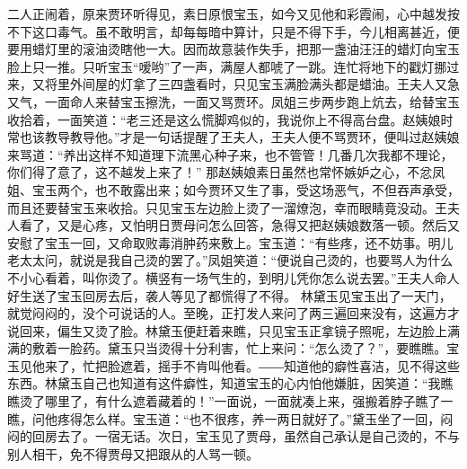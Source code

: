 \documentclass[12pt,oneside]{book}
\begin{document}
二人正闹着，原来贾环听得见，素日原恨宝玉，如今又见他和彩霞闹，心中越发按不下这口毒气。虽不敢明言，却每每暗中算计，只是不得下手，今儿相离甚近，便要用蜡灯里的滚油烫瞎他一大。因而故意装作失手，把那一盏油汪汪的蜡灯向宝玉脸上只一推。只听宝玉“嗳哟”了一声，满屋人都唬了一跳。连忙将地下的戳灯挪过来，又将里外间屋的灯拿了三四盏看时，只见宝玉满脸满头都是蜡油。王夫人又急又气，一面命人来替宝玉擦洗，一面又骂贾环。凤姐三步两步跑上炕去，给替宝玉收拾着，一面笑道：“老三还是这么慌脚鸡似的，我说你上不得高台盘。赵姨娘时常也该教导教导他。”才是一句话提醒了王夫人，王夫人便不骂贾环，便叫过赵姨娘来骂道：“养出这样不知道理下流黑心种子来，也不管管！几番几次我都不理论，你们得了意了，这不越发上来了！”
那赵姨娘素日虽然也常怀嫉妒之心，不忿凤姐、宝玉两个，也不敢露出来；如今贾环又生了事，受这场恶气，不但吞声承受，而且还要替宝玉来收拾。只见宝玉左边脸上烫了一溜燎泡，幸而眼睛竟没动。王夫人看了，又是心疼，又怕明日贾母问怎么回答，急得又把赵姨娘数落一顿。然后又安慰了宝玉一回，又命取败毒消肿药来敷上。宝玉道：“有些疼，还不妨事。明儿老太太问，就说是我自己烫的罢了。”凤姐笑道：“便说自己烫的，也要骂人为什么不小心看着，叫你烫了。横竖有一场气生的，到明儿凭你怎么说去罢。”王夫人命人好生送了宝玉回房去后，袭人等见了都慌得了不得。
林黛玉见宝玉出了一天门，就觉闷闷的，没个可说话的人。至晚，正打发人来问了两三遍回来没有，这遍方才说回来，偏生又烫了脸。林黛玉便赶着来瞧，只见宝玉正拿镜子照呢，左边脸上满满的敷着一脸药。黛玉只当烫得十分利害，忙上来问：“怎么烫了？”，要瞧瞧。宝玉见他来了，忙把脸遮着，摇手不肯叫他看。――知道他的癖性喜洁，见不得这些东西。林黛玉自己也知道有这件癖性，知道宝玉的心内怕他嫌脏，因笑道：“我瞧瞧烫了哪里了，有什么遮着藏着的！”一面说，一面就凑上来，强搬着脖子瞧了一瞧，问他疼得怎么样。宝玉道：“也不很疼，养一两日就好了。”黛玉坐了一回，闷闷的回房去了。一宿无话。次日，宝玉见了贾母，虽然自己承认是自己烫的，不与别人相干，免不得贾母又把跟从的人骂一顿。
\end{document}
